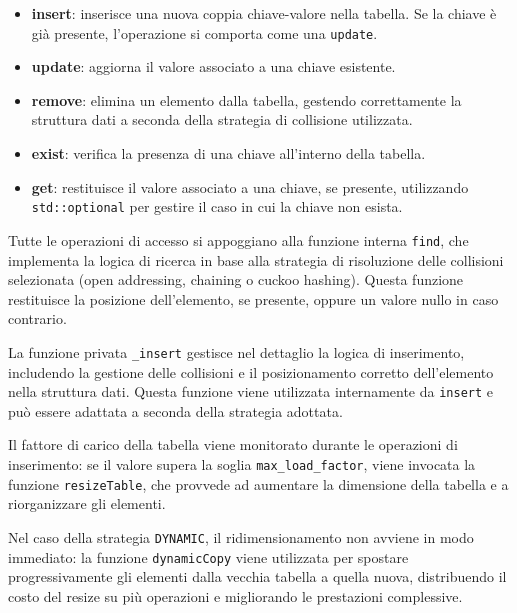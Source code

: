 \begin{itemize}
    \item \textbf{insert}: inserisce una nuova coppia chiave-valore nella tabella. Se la chiave è già presente, 
    l'operazione si comporta come una \texttt{update}.
    
    \item \textbf{update}: aggiorna il valore associato a una chiave esistente.
    
    \item \textbf{remove}: elimina un elemento dalla tabella, gestendo correttamente la struttura dati a seconda della strategia di collisione utilizzata.
    
    \item \textbf{exist}: verifica la presenza di una chiave all'interno della tabella.
    
    \item \textbf{get}: restituisce il valore associato a una chiave, se presente, utilizzando \texttt{std::optional} 
    per gestire il caso in cui la chiave non esista.
\end{itemize}

Tutte le operazioni di accesso si appoggiano alla funzione interna \texttt{find}, che implementa la logica di ricerca in base alla strategia di risoluzione 
delle collisioni selezionata (open addressing, chaining o cuckoo hashing).  
Questa funzione restituisce la posizione dell'elemento, se presente, oppure un valore nullo in caso contrario.

La funzione privata \texttt{\_insert} gestisce nel dettaglio la logica di inserimento, includendo la gestione delle collisioni e il posizionamento corretto 
dell’elemento nella struttura dati.  
Questa funzione viene utilizzata internamente da \texttt{insert} e può essere adattata a seconda della strategia adottata.

Il fattore di carico della tabella viene monitorato durante le operazioni di inserimento: se il valore supera la soglia \texttt{max\_load\_factor}, 
viene invocata la funzione \texttt{resizeTable}, che provvede ad aumentare la dimensione della tabella e a riorganizzare gli elementi.

Nel caso della strategia \texttt{DYNAMIC}, il ridimensionamento non avviene in modo immediato: la funzione \texttt{dynamicCopy} viene utilizzata per 
spostare progressivamente gli elementi dalla vecchia tabella a quella nuova, distribuendo il costo del resize su più operazioni e 
migliorando le prestazioni complessive.
